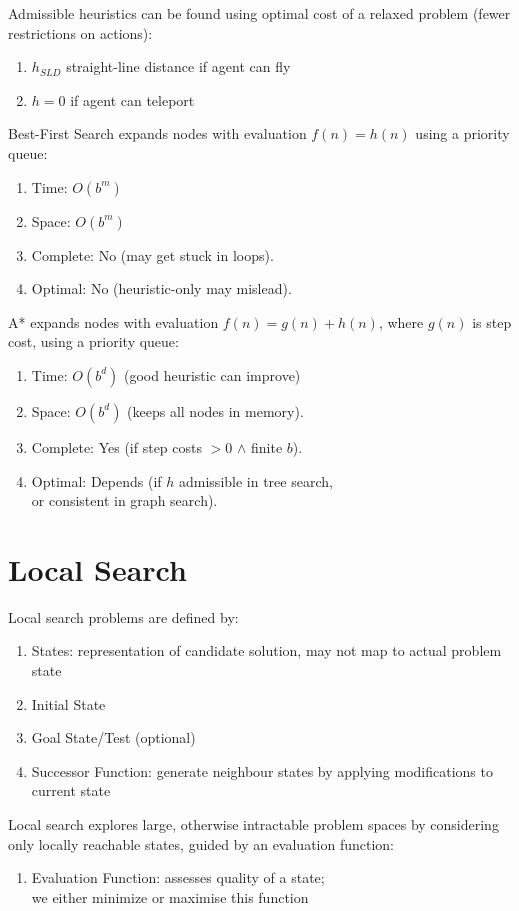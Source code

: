 \documentclass[12pt, a4paper]{article}
\begin{document}
\begin{multicols*}{3}
Admissible heuristics can be found using optimal cost of a relaxed problem (fewer restrictions on actions):
\begin{enumerate}[Ex.]
  \item $h_{SLD}$ straight-line distance if agent can fly
  \item $h = 0$ if agent can teleport
\end{enumerate}

Best-First Search expands nodes with evaluation $f(n) = h(n)$ using a priority queue:
\begin{enumerate}[\roman*.]
  \item Time: $O(b^m)$ 
  \item Space: $O(b^m)$ 
  \item Complete: No (may get stuck in loops).
  \item Optimal: No (heuristic-only may mislead).
\end{enumerate}

A* expands nodes with evaluation $f(n) = g(n) + h(n)$, where $g(n)$ is step cost, using a priority queue:
\begin{enumerate}[\roman*.]
  \item Time: $O(b^d)$ (good heuristic can improve)
  \item Space: $O(b^d)$ (keeps all nodes in memory).
  \item Complete: Yes (if step costs $> 0$ $\land$ finite $b$).
  \item Optimal: Depends (if $h$ admissible in tree search,\\\hfill or consistent in graph search).
\end{enumerate}
\vspace{-1em}
\colbreak 
\section{Local Search}
Local search problems are defined by:
\begin{enumerate}[\roman*.]
  \item States: representation of candidate solution, may not map to actual problem state
  \item Initial State 
  \item Goal State/Test (optional) 
  \item Successor Function: generate neighbour states by applying modifications to current state
\end{enumerate}

Local search explores large, otherwise intractable problem spaces by considering only locally reachable states, guided by an evaluation function:
\begin{enumerate}[\roman*.]
  \item Evaluation Function: assesses quality of a state;\\we either minimize or maximise this function
\end{enumerate}


\end{multicols*}
\end{document}
